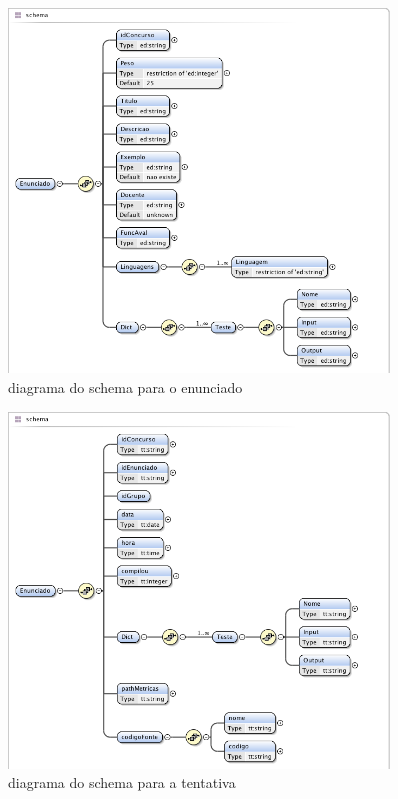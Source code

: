 \begin{figure}[htbp]
\begin{center}
\includegraphics[width=0.9\textwidth]{Images/enunciado_schema}
\caption{diagrama do schema para o enunciado}\label{fig xsd enunciado}
\end{center}
\end{figure}

\begin{figure}[htbp]
\begin{center}
\includegraphics[width=0.9\textwidth]{Images/tentativa_schema}
\caption{diagrama do schema para a tentativa}\label{fig xsd tentativa}
\end{center}
\end{figure}
